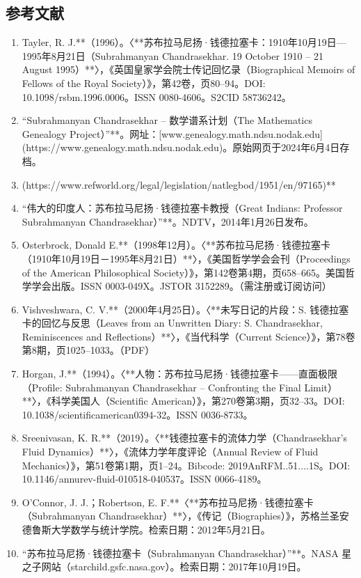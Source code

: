\subsection{参考文献}
\begin{enumerate}
\item Tayler, R. J.**（1996）。〈**苏布拉马尼扬·钱德拉塞卡：1910年10月19日—1995年8月21日（Subrahmanyan Chandrasekhar. 19 October 1910 – 21 August 1995）**〉，《英国皇家学会院士传记回忆录（Biographical Memoirs of Fellows of the Royal Society）》，第42卷，页80–94。DOI: 10.1098/rsbm.1996.0006。ISSN 0080-4606。S2CID 58736242。
\item “Subrahmanyan Chandrasekhar – 数学谱系计划（The Mathematics Genealogy Project）”**。网址：[www.genealogy.math.ndsu.nodak.edu](https://www.genealogy.math.ndsu.nodak.edu)。原始网页于2024年6月4日存档。
\item [1](https://www.refworld.org/legal/legislation/natlegbod/1951/en/97165)**
\item “伟大的印度人：苏布拉马尼扬·钱德拉塞卡教授（Great Indians: Professor Subrahmanyan Chandrasekhar）”**。NDTV，2014年1月26日发布。
\item Osterbrock, Donald E.**（1998年12月）。〈**苏布拉马尼扬·钱德拉塞卡（1910年10月19日－1995年8月21日）**〉，《美国哲学学会会刊（Proceedings of the American Philosophical Society）》，第142卷第4期，页658–665。美国哲学学会出版。ISSN 0003-049X。JSTOR 3152289。（需注册或订阅访问）
\item Vishveshwara, C. V.**（2000年4月25日）。〈**未写日记的片段：S. 钱德拉塞卡的回忆与反思（Leaves from an Unwritten Diary: S. Chandrasekhar, Reminiscences and Reflections）**〉，《当代科学（Current Science）》，第78卷第8期，页1025–1033。（PDF）
\item Horgan, J.**（1994）。〈**人物：苏布拉马尼扬·钱德拉塞卡——直面极限（Profile: Subrahmanyan Chandrasekhar – Confronting the Final Limit）**〉，《科学美国人（Scientific American）》，第270卷第3期，页32–33。DOI: 10.1038/scientificamerican0394-32。ISSN 0036-8733。
\item Sreenivasan, K. R.**（2019）。〈**钱德拉塞卡的流体力学（Chandrasekhar’s Fluid Dynamics）**〉，《流体力学年度评论（Annual Review of Fluid Mechanics）》，第51卷第1期，页1–24。Bibcode: 2019AnRFM..51....1S。DOI: 10.1146/annurev-fluid-010518-040537。ISSN 0066-4189。
\item O’Connor, J. J.；Robertson, E. F.**〈**苏布拉马尼扬·钱德拉塞卡（Subrahmanyan Chandrasekhar）**〉，《传记（Biographies）》，苏格兰圣安德鲁斯大学数学与统计学院。检索日期：2012年5月21日。
\item “苏布拉马尼扬·钱德拉塞卡（Subrahmanyan Chandrasekhar）”**。NASA 星之子网站（starchild.gsfc.nasa.gov）。检索日期：2017年10月19日。

\end{enumerate}
